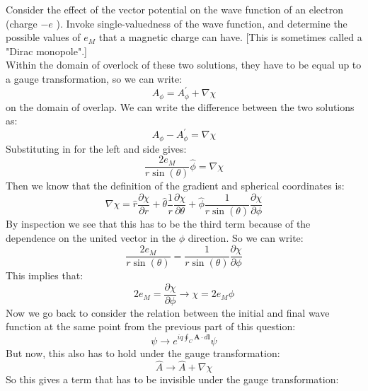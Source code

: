 \documentclass[12pt]{article}
\begin{document}
Consider the effect of the vector potential on the wave function of an electron (charge $-e$ ). Invoke single-valuedness of the wave function, and determine the possible values of $e_{M}$ that a magnetic charge can have. [This is sometimes called a "Dirac monopole".]\\
Within the domain of overlock of these two  solutions, they have to be equal up to a gauge transformation, so we can write:
\begin{equation}
A_{\phi} = A_{\phi}^{\prime} + \nabla \chi
\end{equation}
on the domain of overlap. We can write the difference between the two solutions as:
\begin{equation}
A_{\phi} - A_{\phi}^{\prime} = \nabla \chi
\end{equation} 
Substituting in for the left and side gives:
\begin{equation}
\frac{2e_M}{r\sin(\theta)} \hat{\phi } = \nabla \chi
\end{equation}
Then we know that the definition of the gradient and spherical coordinates is:
\begin{equation}
\nabla \chi = \hat{r} \frac{\partial \chi}{\partial r} + \hat{\theta} \frac{1}{r} \frac{\partial \chi}{\partial \theta} + \hat{\phi} \frac{1}{r \sin(\theta)} \frac{\partial \chi}{\partial \phi}
\end{equation}
By inspection we see that this has to be the third term because of the dependence on the united vector in the $\phi$ direction. So we can write:
\begin{equation}
\frac{2e_M}{r\sin(\theta)} = \frac{1}{r \sin(\theta)} \frac{\partial \chi}{\partial \phi}
\end{equation}
This implies that:
\begin{equation}
2e_M = \frac{\partial \chi}{\partial \phi} \rightarrow \chi = 2e_M \phi
\end{equation}
Now we go back to consider the relation between the initial and final wave function at the same point from the previous part of this question:
\begin{equation}
\psi \rightarrow e^{i q \oint_C \boldsymbol{A} \cdot d \boldsymbol{l}} \psi
\end{equation}
But now, this also has to hold under the gauge transformation:
\begin{equation}
\hat{A} \rightarrow \hat{A} + \nabla \chi
\end{equation}
So this gives a term that has to be invisible under the gauge transformation:
\end{document}
